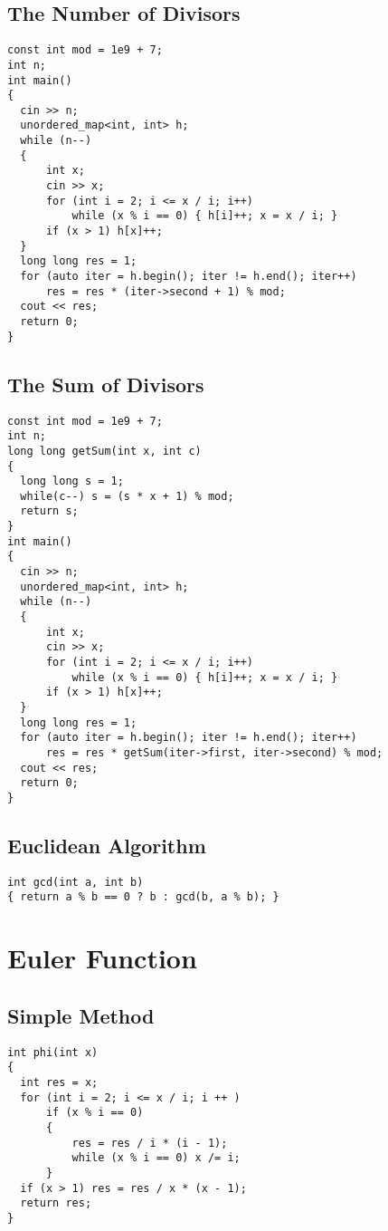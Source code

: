 \subsection{The Number of Divisors}
\begin{lstlisting}
const int mod = 1e9 + 7;
int n;
int main()
{
  cin >> n;
  unordered_map<int, int> h;
  while (n--)
  {
      int x;
      cin >> x;
      for (int i = 2; i <= x / i; i++)
          while (x % i == 0) { h[i]++; x = x / i; }
      if (x > 1) h[x]++;
  }
  long long res = 1;
  for (auto iter = h.begin(); iter != h.end(); iter++)
      res = res * (iter->second + 1) % mod;
  cout << res;
  return 0;
}
\end{lstlisting}
\subsection{The Sum of Divisors}
\begin{lstlisting}
const int mod = 1e9 + 7;
int n;
long long getSum(int x, int c)
{
  long long s = 1;
  while(c--) s = (s * x + 1) % mod;
  return s;
}
int main()
{
  cin >> n;
  unordered_map<int, int> h;
  while (n--)
  {
      int x;
      cin >> x;
      for (int i = 2; i <= x / i; i++)
          while (x % i == 0) { h[i]++; x = x / i; }
      if (x > 1) h[x]++;
  }
  long long res = 1;
  for (auto iter = h.begin(); iter != h.end(); iter++)
      res = res * getSum(iter->first, iter->second) % mod;
  cout << res;
  return 0;
}
\end{lstlisting}
\subsection{Euclidean Algorithm}
\begin{lstlisting}
int gcd(int a, int b) 
{ return a % b == 0 ? b : gcd(b, a % b); }
\end{lstlisting}
\section{Euler Function}
\subsection{Simple Method}
\begin{lstlisting}
int phi(int x)
{
  int res = x;
  for (int i = 2; i <= x / i; i ++ )
      if (x % i == 0)
      {
          res = res / i * (i - 1);
          while (x % i == 0) x /= i;
      }
  if (x > 1) res = res / x * (x - 1);
  return res;
}
\end{lstlisting}
